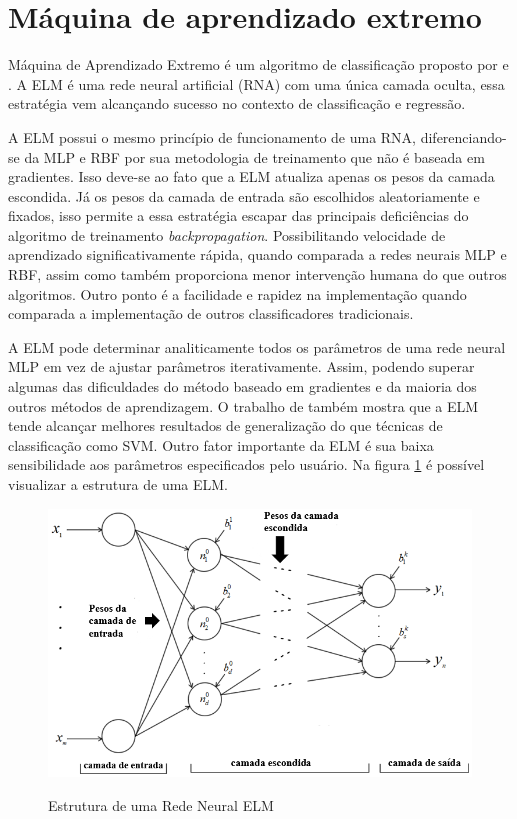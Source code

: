 \section{Máquina de aprendizado extremo}
\label{sec:ELM}

Máquina de Aprendizado Extremo é um algoritmo de classificação proposto por  \cite{Huang_2006} e \cite{Huang_2009}. A ELM é uma rede neural artificial (RNA) com uma única camada oculta, essa estratégia vem alcançando sucesso no contexto de classificação e regressão. 

A ELM possui o mesmo princípio de funcionamento de uma RNA,   diferenciando-se da MLP e RBF por sua metodologia de treinamento que não é baseada em gradientes. Isso deve-se ao fato que a ELM atualiza apenas os pesos da camada escondida. Já os pesos da camada de entrada são escolhidos aleatoriamente e fixados, isso permite a essa estratégia escapar das principais deficiências do algoritmo de treinamento \textit{backpropagation}. Possibilitando velocidade de aprendizado significativamente rápida, quando comparada a redes neurais MLP e RBF, assim como também proporciona menor intervenção humana do que outros algoritmos. Outro ponto é a facilidade e rapidez na implementação quando comparada a implementação de outros classificadores tradicionais.

A ELM pode determinar analiticamente todos os parâmetros de uma rede neural MLP em vez de ajustar parâmetros iterativamente. Assim, podendo superar algumas das dificuldades do método baseado em gradientes e da maioria dos outros métodos de aprendizagem. O trabalho de \cite{Huang_2006} também mostra que a ELM tende alcançar melhores resultados de generalização do que técnicas de classificação como SVM. Outro fator importante da ELM é sua baixa sensibilidade aos parâmetros especificados pelo usuário. Na figura \ref{fig:ELM} é possível visualizar a estrutura de uma ELM.

\begin{figure}[H]
\centering
\caption{Estrutura de uma Rede Neural ELM}
\includegraphics[scale=0.60]{imgs/ELM.png}
\label{fig:ELM}
\end{figure}



